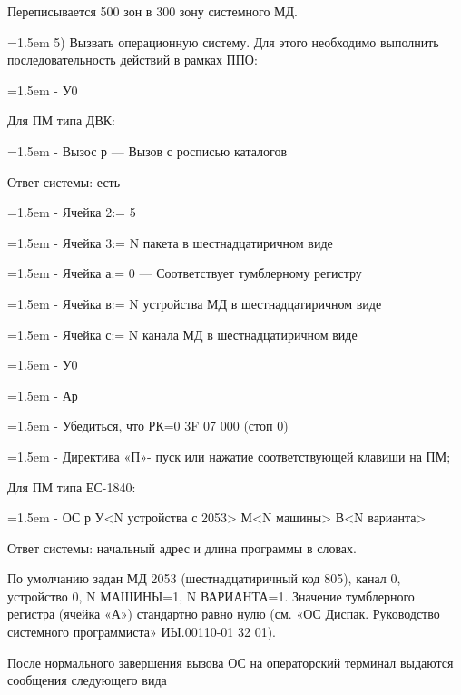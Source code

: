 \documentclass[11pt,a4paper]{article}
\begin{document}
Переписывается 500 зон в 300 зону системного МД.

\par\hangindent=1.5em 5) Вызвать операционную систему. Для этого необходимо выполнить последовательность действий в рамках ППО:\par
\par\hangindent=1.5em - У0\par
Для ПМ типа ДВК:

\par\hangindent=1.5em - Вызос р --- Вызов с росписью каталогов\par
Ответ системы: есть

\par\hangindent=1.5em - Ячейка 2:= 5\par
\par\hangindent=1.5em - Ячейка 3:= N пакета в шестнадцатиричном виде\par
\par\hangindent=1.5em - Ячейка а:= 0 --- Соответствует тумблерному регистру\par
\par\hangindent=1.5em - Ячейка в:= N устройства МД в шестнадцатиричном виде\par
\par\hangindent=1.5em - Ячейка с:= N канала МД в шестнадцатиричном виде\par
\par\hangindent=1.5em - У0\par
\par\hangindent=1.5em - Ар\par
\par\hangindent=1.5em - Убедиться, что РК=0 3F 07 000 (стоп 0)\par
\par\hangindent=1.5em - Директива «П»- пуск или нажатие соответствующей клавиши на ПМ;\par
Для ПМ типа ЕС-1840:

\par\hangindent=1.5em - ОС р У<N устройства с 2053> М<N машины> В<N варианта>\par
Ответ системы: начальный адрес и длина программы в словах.

По умолчанию задан МД 2053 (шестнадцатиричный код 805), канал 0, устройство 0, N МАШИНЫ=1, N ВАРИАНТА=1. Значение тумблерного регистра (ячейка «А») стандартно равно нулю (см. «ОС Диспак. Руководство системного программиста» ИЫ.00110-01 32 01).

После нормального завершения вызова ОС на операторский терминал выдаются сообщения следующего вида
\end{document}
